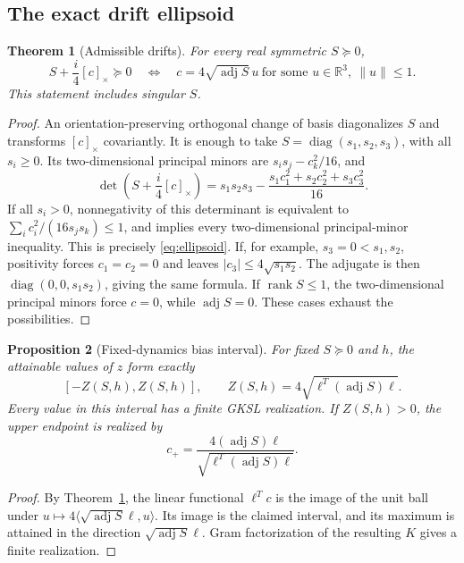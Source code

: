 \documentclass[11pt]{article}
\newtheorem{theorem}{Theorem}[section]
\newtheorem{proposition}[theorem]{Proposition}
\theoremstyle{definition}
\theoremstyle{remark}
\DeclareMathOperator{\rank}{rank}
\DeclareMathOperator{\adj}{adj}
\DeclareMathOperator{\diag}{diag}
\newcommand{\R}{\mathbb R}
\newcommand{\PSD}{\succeq0}
\begin{document}
\subsection{The exact drift ellipsoid}
\begin{theorem}[Admissible drifts]\label{thm:drift-ellipsoid}
For every real symmetric \(S\PSD\),
\begin{equation}\label{eq:ellipsoid}
 S+\frac{i}{4}[c]_\times\PSD
 \quad\Longleftrightarrow\quad
 c=4\sqrt{\adj S}\,u\ \text{for some }u\in\R^3,\ \|u\|\leq1.
\end{equation}
This statement includes singular \(S\).
\end{theorem}
\begin{proof}
An orientation-preserving orthogonal change of basis diagonalizes \(S\) and transforms \([c]_\times\) covariantly. It is enough to take \(S=\diag(s_1,s_2,s_3)\), with all \(s_i\geq0\). Its two-dimensional principal minors are
\(s_i s_j-c_k^2/16\), and
\begin{equation}\label{eq:det-ellipsoid}
 \det\left(S+\frac{i}{4}[c]_\times\right)
 =s_1s_2s_3-\frac{s_1c_1^2+s_2c_2^2+s_3c_3^2}{16}.
\end{equation}
If all \(s_i>0\), nonnegativity of this determinant is equivalent to
\(\sum_i c_i^2/(16s_js_k)\leq1\), and implies every two-dimensional principal-minor inequality. This is precisely \eqref{eq:ellipsoid}. If, for example, \(s_3=0<s_1,s_2\), positivity forces \(c_1=c_2=0\) and leaves \(|c_3|\leq4\sqrt{s_1s_2}\). The adjugate is then \(\diag(0,0,s_1s_2)\), giving the same formula. If \(\rank S\leq1\), the two-dimensional principal minors force \(c=0\), while \(\adj S=0\). These cases exhaust the possibilities.
\end{proof}

\begin{proposition}[Fixed-dynamics bias interval]\label{prop:fixed-drift}
For fixed \(S\PSD\) and \(h\), the attainable values of \(z\) form exactly
\begin{equation}\label{eq:bias-interval}
 [-Z(S,h),Z(S,h)],\qquad
 Z(S,h)=4\sqrt{\ell^T(\adj S)\ell}.
\end{equation}
Every value in this interval has a finite GKSL realization. If \(Z(S,h)>0\), the upper endpoint is realized by
\begin{equation}\label{eq:optimal-drift}
 c_+=\frac{4(\adj S)\ell}{\sqrt{\ell^T(\adj S)\ell}}.
\end{equation}
\end{proposition}
\begin{proof}
By Theorem~\ref{thm:drift-ellipsoid}, the linear functional \(\ell^Tc\) is the image of the unit ball under \(u\mapsto4\langle\sqrt{\adj S}\ell,u\rangle\). Its image is the claimed interval, and its maximum is attained in the direction \(\sqrt{\adj S}\ell\). Gram factorization of the resulting \(K\) gives a finite realization.
\end{proof}
\end{document}
